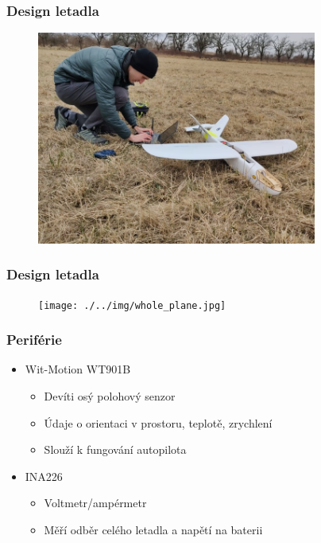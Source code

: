 \documentclass[aspectratio=43]{beamer}
\begin{document}
\begin{frame}[fragile]
	\frametitle{Design letadla}
	\begin{figure}[h]
		\centering
		\includegraphics[height=7cm]{./../img/photo1.jpg}
	\end{figure}
\end{frame}

\begin{frame}[fragile]
	\frametitle{Design letadla}
	\begin{figure}[h]
		\centering
		\texttt{[image: ./../img/whole\_plane.jpg]}
	\end{figure}
\end{frame}


\begin{frame}[fragile]
	\frametitle{Periférie}
	\begin{itemize}
		\item Wit-Motion WT901B
			\begin{itemize}
				\item Devíti osý polohový senzor
				\item Údaje o orientaci v prostoru, teplotě, zrychlení
				\item Slouží k fungování autopilota
			\end{itemize}
		\item INA226
			\begin{itemize}
				\item Voltmetr/ampérmetr
				\item Měří odběr celého letadla a napětí na baterii
			\end{itemize}
	\end{itemize}
\end{frame}
\end{document}
